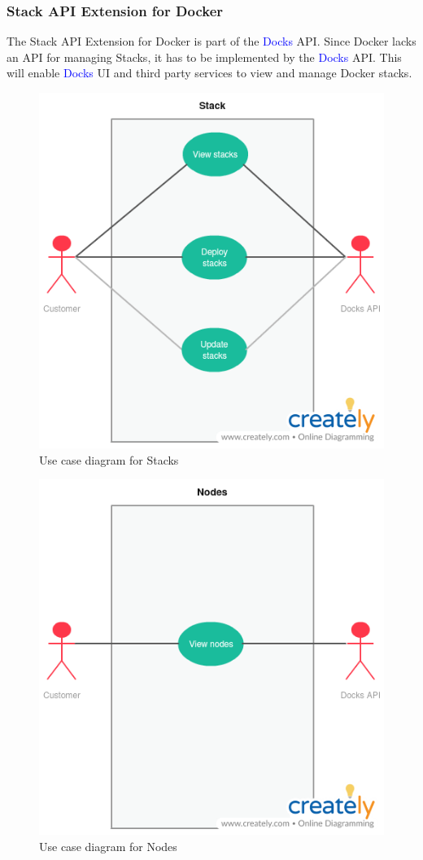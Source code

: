 \documentclass[]{article}
\newcommand{\docks}{\textcolor{Blue}{Docks} }
\newcommand{\docker}{Docker }
\begin{document}
\subsubsection{Stack API Extension for Docker}
The Stack API Extension for \docker is part of the \docks API.
Since \docker lacks an API for managing Stacks, it has to be implemented
by the \docks API. This will enable \docks UI and third party services
to view and manage \docker stacks.

\begin{figure}[H]
	\centering
	\includegraphics[scale=0.5]{uml/stacks.png}
	\caption{Use case diagram for Stacks}
\end{figure}

\begin{figure}[H]
	\centering
	\includegraphics[scale=0.5]{uml/nodes.png}
	\caption{Use case diagram for Nodes}
\end{figure}
\end{document}
